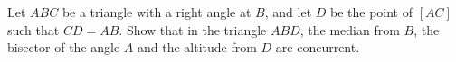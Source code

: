 Let $ABC$ be a triangle with a right angle at $B$, and let $D$ be the point of $[AC]$ such that $CD = AB$. Show that in the triangle $ABD$, the median from $B$, the bisector of the angle $A$ and the altitude from $D$ are concurrent.
